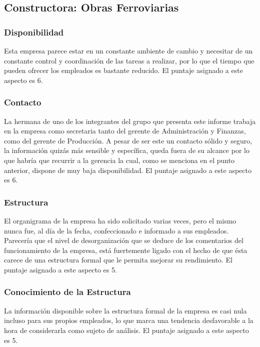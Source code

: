 \documentclass[12pt,a4paper,spanish]{article}
\begin{document}
\subsection{Constructora: Obras Ferroviarias}
\subsubsection{Disponibilidad}

Esta empresa parece estar en un constante ambiente de cambio y necesitar de un constante control y coordinaci\'{o}n de las tareas a realizar, por lo que el tiempo que pueden ofrecer los empleados es bastante reducido. El puntaje asignado a este aspecto es 6.

\subsubsection{Contacto}

La hermana de uno de los integrantes del grupo que presenta este informe trabaja en la empresa como secretaria tanto del gerente de Administraci\'{o}n y Finanzas, como del gerente de Producci\'{o}n. A pesar de ser este un contacto s\'{o}lido y seguro, la informaci\'{o}n quiz\'{a}s m\'{a}s sensible y espec\'{i}fica, queda fuera de su alcance por lo que habr\'{i}a que recurrir a la gerencia la cual, como se menciona en el punto anterior, dispone de muy baja disponibilidad. El puntaje asignado a este aspecto es 6.

\subsubsection{Estructura}

El organigrama de la empresa ha sido solicitado varias veces, pero el mismo nunca fue, al d\'{i}a de la fecha, confeccionado e informado a sus empleados. Parecer\'{i}a que el nivel de desorganizaci\'{o}n que se deduce de los comentarios del funcionamiento de la empresa, est\'{a} fuertemente ligado con el hecho de que \'{e}sta carece de una estructura formal que le permita mejorar su rendimiento. El puntaje asignado a este aspecto es 5.

\subsubsection{Conocimiento de la Estructura}

La informaci\'{o}n disponible sobre la estructura formal de la empresa es casi nula incluso para sus propios empleados, lo que marca una tendencia desfavorable a la hora de considerarla como sujeto de an\'{a}lisis. El puntaje asignado a este aspecto es 5.
\end{document}
